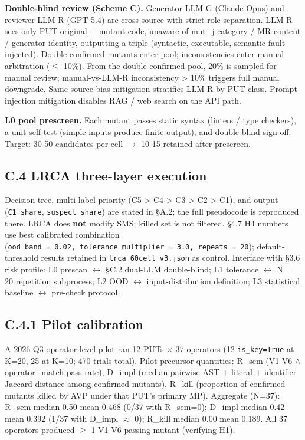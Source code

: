 \documentclass[acmsmall,screen,review]{acmart}
\begin{document}
\textbf{Double-blind review (Scheme C).} Generator LLM-G (Claude Opus)
and reviewer LLM-R (GPT-5.4) are cross-source with strict role
separation. LLM-R sees only PUT original + mutant code, unaware of
mut\_j category / MR content / generator identity, outputting a triple
(syntactic, executable, semantic-fault-injected). Double-confirmed
mutants enter pool; inconsistencies enter manual arbitration ($\leq$ 10\%).
From the double-confirmed pool, 20\% is sampled for manual review;
manual-vs-LLM-R inconsistency \textgreater{} 10\% triggers full manual
downgrade. Same-source bias mitigation stratifies LLM-R by PUT class.
Prompt-injection mitigation disables RAG / web search on the API path.

\textbf{L0 pool prescreen.} Each mutant passes static syntax (linters /
type checkers), a unit self-test (simple inputs produce finite output),
and double-blind sign-off. Target: 30-50 candidates per cell $\to$ 10-15
retained after prescreen.

\subsection{C.4 LRCA three-layer execution}\label{c.4-lrca-three-layer-execution-full}

Decision tree, multi-label priority (C5 \textgreater{} C4 \textgreater{}
C3 \textgreater{} C2 \textgreater{} C1), and output (\texttt{C1\_share},
\texttt{suspect\_share}) are stated in §A.2; the full pseudocode is
reproduced there. LRCA does \textbf{not} modify SMS; killed set is not
filtered. §4.7 H4 numbers use best calibrated combination
(\texttt{ood\_band\ =\ 0.02,\ tolerance\_multiplier\ =\ 3.0,\ repeats\ =\ 20});
default-threshold results retained in \texttt{lrca\_60cell\_v3.json} as
control. Interface with §3.6 risk profile: L0 prescan $\leftrightarrow$ §C.2 dual-LLM
double-blind; L1 tolerance $\leftrightarrow$ N = 20 repetition subprocess; L2 OOD $\leftrightarrow$
input-distribution definition; L3 statistical baseline $\leftrightarrow$ pre-check
protocol.

\subsection{C.4.1 Pilot calibration}\label{c.4.1-pilot-calibration-37-operators-k-1020}

A 2026 Q3 operator-level pilot ran 12 PUTs $\times$ 37 operators (12
\texttt{is\_key=True} at K=20, 25 at K=10; 470 trials total). Pilot
precursor quantities: R\_sem (V1-V6 $\wedge$ operator\_match pass rate),
D\_impl (median pairwise AST + literal + identifier Jaccard distance
among confirmed mutants), R\_kill (proportion of confirmed mutants
killed by AVP under that PUT's primary MP). Aggregate (N=37): R\_sem
median 0.50 mean 0.468 (0/37 with R\_sem=0); D\_impl median 0.42 mean
0.392 (1/37 with D\_impl $\approx$ 0); R\_kill median 0.00 mean 0.189. All 37
operators produced $\geq$ 1 V1-V6 passing mutant (verifying H1).
\end{document}
